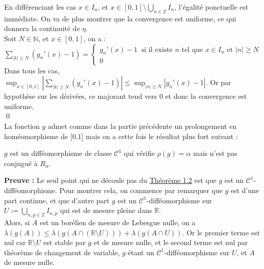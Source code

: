 \documentclass[11pt,a4paper]{article}
\begin{document}
%
%

En différenciant les cas $x \in I_n$, et $\displaystyle x\in [0,1] \setminus \bigcup_{n \in \mathbb{Z}} I_n$, l'égalité ponctuelle est immédiate. On va de plus montrer que la convergence est uniforme, ce qui donnera la continuité de $\eta$. \\ 
Soit $N \in \mathbb{N}$, et $x\in [0,1]$, on a : $\displaystyle \sum_{|k| \geq N} (g_n'(x)-1)= \begin{cases} g_n'(x)-1 \ \text{ si il existe } n \text{ tel que } x\in I_n \text{ et } |n|\geq N\\ 0 \end{cases}$ \\
Dans tous les cas, $\displaystyle \sup_{x\in [0,1]} \left | \sum_{|k| \geq N} (g_n'(x)-1) \right | \leq \sup_{|n| \geq N} |g_n'(x) -1|$. Or par hypothèse sur les dérivées, ce majorant tend vers $0$ et donc la convergence est uniforme. \\ \qed \\

La fonction $g$ admet comme dans la partie précédente un prolongement en homéomorphisme de [0,1] mais on a cette fois le résultat plus fort suivant :

\begin{theorem}
$g$ est un difféomorphisme de classe $\mathcal{C}^1$ qui vérifie $\rho(g)=\alpha$ mais n'est pas conjugué à $R_\alpha$.
\end{theorem}


\textbf{Preuve :} Le seul point qui ne découle pas du \hyperref[th:cont]{Théorème 1.2} est que $g$ est un $\mathcal{C}^1$-difféomorphisme. Pour montrer cela, on commence par remarquer que $g$ est d'une part continue, et que d'autre part $g$ est un $\mathcal{C}^1$-difféomorphisme sur $\displaystyle U := \bigcup_{n,p\in \mathbb{Z}} I_{n,p}$ qui est de mesure pleine dans $\mathbb{R}$. \\
Alors, si $A$ est un borélien de mesure de Lebesgue nulle, on a $\lambda(g(A)) \leq \lambda(g(A\cap (\mathbb{R} \setminus U))) + \lambda(g(A\cap U))$. 
Or le premier terme est nul car $\mathbb{R} \setminus U$ est stable par $g$ et de mesure nulle, et le second terme est nul par théorème de changement de variable, $g$ étant un $\mathcal{C}^1$-difféomorphisme sur $ U $, et $A$ de mesure nulle. \\
\end{document}
